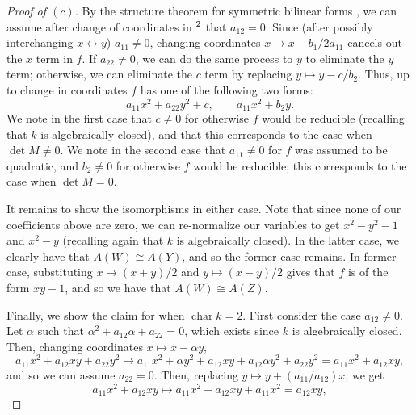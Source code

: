 \documentclass[12pt,letterpaper]{article}
\theoremstyle{definition}
\theoremstyle{remark}
\numberwithin{equation}{section}
\numberwithin{figure}{problem}
\let\AA\relax
\DeclareMathOperator{\AA}{\mathbb{A}}
\DeclareMathOperator{\Char}{char}
\begin{document}
\begin{proof}[Proof of
  $(c)$]
  By the structure theorem for symmetric bilinear forms \cite[Ch.~XV, Thm.~3.1]{Lan02}, we can assume after change of coordinates in
  $\AA^2$ that
  $a_{12} =
  0$.
  Since (after possibly interchanging
  $x \leftrightarrow
  y$)
  $a_{11} \ne
  0$, changing coordinates
  $x \mapsto x -
  b_1/2a_{11}$ cancels out the
  $x$ term in
  $f$.
  If
  $a_{22} \ne
  0$, we can do the same process to
  $y$ to eliminate the
  $y$ term; otherwise, we can eliminate the
  $c$ term by replacing
  $y \mapsto y -
  c/b_2$.
  Thus, up to change in coordinates
  $f$ has one of the following two forms:
  \begin{equation*}
    a_{11}x^2 + a_{22}y^2 + c, \qquad a_{11}x^2 + b_2y.
  \end{equation*}
  We note in the first case that
  $c \ne
  0$ for otherwise
  $f$ would be reducible (recalling that
  $k$ is algebraically closed), and that this corresponds to the case when
  $\det M \ne
  0$.
  We note in the second case that
  $a_{11} \ne
  0$ for
  $f$ was assumed to be quadratic, and
  $b_2 \ne
  0$ for otherwise
  $f$ would be reducible; this corresponds to the case when
  $\det M =
  0$.
  \par It remains to show the isomorphisms in either case.
  Note that since none of our coefficients above are zero, we can re-normalize our variables to get
  $x^2 - y^2 -
  1$ and
  $x^2 -
  y$ (recalling again that
  $k$ is algebraically closed).
  In the latter case, we clearly have that
  $A(W) \cong
  A(Y)$, and so the former case remains.
  In former case, substituting
  $x \mapsto
  (x+y)/2$ and
  $y \mapsto
  (x-y)/2$ gives that
  $f$ is of the form
  $xy -
  1$, and so we have that
  $A(W) \cong
  A(Z)$.
  \par Finally, we show the claim for when
  $\Char k =
  2$.
  First consider the case
  $a_{12} \ne
  0$.
  Let
  $\alpha$ such that
  $\alpha^2 + a_{12}\alpha + a_{22} =
  0$, which exists since
  $k$ is algebraically closed.
  Then, changing coordinates
  $x \mapsto x - \alpha
  y$,
  \begin{equation*}
    a_{11}x^2 + a_{12}xy + a_{22}y^2 \mapsto a_{11}x^2 + \alpha y^2 + a_{12}xy + a_{12}\alpha y^2 + a_{22}y^2 = a_{11}x^2 + a_{12}xy,
  \end{equation*}
  and so we can assume
  $a_{22} =
  0$.
  Then, replacing
  $y \mapsto y +
  (a_{11}/a_{12})x$, we get
  \begin{equation*}
    a_{11}x^2 + a_{12}xy \mapsto a_{11}x^2 + a_{12}xy + a_{11}x^2 = a_{12}xy,

\end{equation*}
\end{proof}
\end{document}
